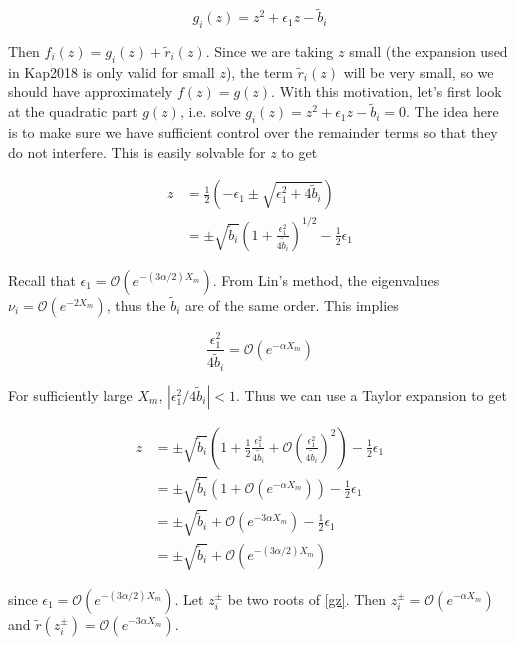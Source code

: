 \documentclass[12pt]{article}
\begin{document}
\begin{equation}\label{gz}
g_i(z) = z^2 + \epsilon_1 z - \tilde{b}_i
\end{equation}

Then $f_i(z) = g_i(z) + \tilde{r}_i(z)$. Since we are taking $z$ small (the expansion used in Kap2018 is only valid for small $z$), the term $\tilde{r}_i(z)$ will be very small, so we should have approximately $f(z) = g(z)$. With this motivation, let's first look at the quadratic part $g(z)$, i.e. solve $g_i(z) = z^2 + \epsilon_1 z - \tilde{b}_i = 0$. The idea here is to make sure we have sufficient control over the remainder terms so that they do not interfere. This is easily solvable for $z$ to get

\begin{align*}
z &= \frac{1}{2}\left(-\epsilon_1 \pm \sqrt{\epsilon_1^2 + 4 \tilde{b}_i}\right) \\
&=  \pm \sqrt{\tilde{b}_i} \left( 1 + \frac{\epsilon_1^2}{4 \tilde{b}_i} \right)^{1/2} - \frac{1}{2} \epsilon_1
\end{align*}

Recall that $\epsilon_1  = \mathcal{O}(e^{-(3 \alpha/2) X_m})$. From Lin's method, the eigenvalues $\nu_i = \mathcal{O}(e^{-2 X_m})$, thus the $\tilde{b}_i$ are of the same order. This implies

\begin{equation}
\frac{\epsilon_1^2}{4 \tilde{b}_i} = \mathcal{O}(e^{-\alpha X_m})
\end{equation}

For sufficiently large $X_m$, $|\epsilon_1^2/4 \tilde{b}_i| < 1$. Thus we can use a Taylor expansion to get

\begin{align*}
z &= \pm \sqrt{\tilde{b}_i} \left( 1 + \frac{1}{2} \frac{\epsilon_1^2}{4 \tilde{b}_i} + \mathcal{O}\left( \frac{\epsilon_1^2}{4 \tilde{b}_i}\right)^2 \right) - \frac{1}{2} \epsilon_1 \\
&= \pm \sqrt{\tilde{b}_i} \left( 1 + \mathcal{O}(e^{-\alpha X_m}) \right) - \frac{1}{2} \epsilon_1 \\
&= \pm \sqrt{\tilde{b}_i} + \mathcal{O}(e^{-3 \alpha X_m}) - \frac{1}{2} \epsilon_1 \\
&= \pm \sqrt{\tilde{b}_i} + \mathcal{O}(e^{-(3 \alpha/2) X_m})
\end{align*}

since $\epsilon_1  = \mathcal{O}(e^{-(3 \alpha/2) X_m})$. Let $z_i^\pm$ be two roots of \eqref{gz}. Then $z_i^\pm = \mathcal{O}(e^{-\alpha X_m})$ and $\tilde{r}(z_i^\pm) = \mathcal{O}(e^{-3 \alpha X_m})$.\\
\end{document}
